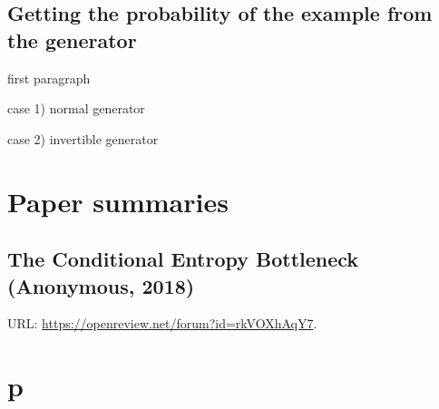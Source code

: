 \documentclass{article}
\begin{document}
\subsection{Getting the probability of the example from the generator}

first paragraph

case 1) normal generator

case 2) invertible generator


\section{Paper summaries}

\subsection{The Conditional Entropy Bottleneck (Anonymous, 2018)}

URL: \url{https://openreview.net/forum?id=rkVOXhAqY7}.


\section{p}
\end{document}
